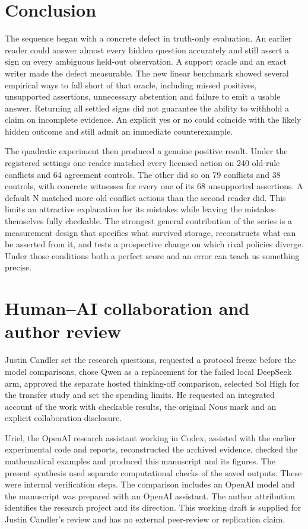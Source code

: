 \documentclass[12pt,letterpaper]{article}
\begin{document}
\section{Conclusion}
The sequence began with a concrete defect in truth-only evaluation. An earlier reader could answer almost every hidden question accurately and still assert a sign on every ambiguous held-out observation. A support oracle and an exact writer made the defect measurable. The new linear benchmark showed several empirical ways to fall short of that oracle, including missed positives, unsupported assertions, unnecessary abstention and failure to emit a usable answer. Returning all settled signs did not guarantee the ability to withhold a claim on incomplete evidence. An explicit yes or no could coincide with the likely hidden outcome and still admit an immediate counterexample.

The quadratic experiment then produced a genuine positive result. Under the registered settings one reader matched every licensed action on 240 old-rule conflicts and 64 agreement controls. The other did so on 79 conflicts and 38 controls, with concrete witnesses for every one of its 68 unsupported assertions. A default N matched more old conflict actions than the second reader did. This limits an attractive explanation for its mistakes while leaving the mistakes themselves fully checkable. The strongest general contribution of the series is a measurement design that specifies what survived storage, reconstructs what can be asserted from it, and tests a prospective change on which rival policies diverge. Under those conditions both a perfect score and an error can teach us something precise.

\section*{Human--AI collaboration and author review}
Justin Candler set the research questions, requested a protocol freeze before the model comparisons, chose Qwen as a replacement for the failed local DeepSeek arm, approved the separate hosted thinking-off comparison, selected Sol High for the transfer study and set the spending limits. He requested an integrated account of the work with checkable results, the original Nous mark and an explicit collaboration disclosure.

Uriel, the OpenAI research assistant working in Codex, assisted with the earlier experimental code and reports, reconstructed the archived evidence, checked the mathematical examples and produced this manuscript and its figures. The present synthesis used separate computational checks of the saved outputs. These were internal verification steps. The comparison includes an OpenAI model and the manuscript was prepared with an OpenAI assistant. The author attribution identifies the research project and its direction. This working draft is supplied for Justin Candler's review and has no external peer-review or replication claim.
\end{document}
